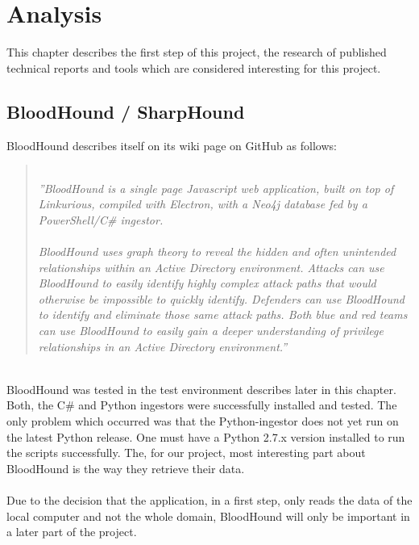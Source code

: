 \section{Analysis}
This chapter describes the first step of this project, the research of published technical reports and tools which are considered interesting for this project.
\subsection{BloodHound / SharpHound}
BloodHound describes itself on its wiki page on GitHub as follows:
\begin{quotation} \ \\
\textit{''BloodHound is a single page Javascript web application, built on top of Linkurious, compiled with Electron, with a Neo4j database fed by a PowerShell/C\# ingestor. \\
\ \\
BloodHound uses graph theory to reveal the hidden and often unintended relationships within an Active Directory environment. Attacks can use BloodHound to easily identify highly complex attack paths that would otherwise be impossible to quickly identify. Defenders can use BloodHound to identify and eliminate those same attack paths. Both blue and red teams can use BloodHound to easily gain a deeper understanding of privilege relationships in an Active Directory environment.''} 
\cite{blo2018}
\end{quotation}
\ \\
BloodHound was tested in the test environment describes later in this chapter. Both, the C\# and Python ingestors were successfully installed and tested. The only problem which occurred was that the Python-ingestor does not yet run on the latest Python release. One must have a Python 2.7.x version installed to run the scripts successfully.
The, for our project, most interesting part about BloodHound is the way they retrieve their data. \ \\
\ \\
Due to the decision that the application, in a first step, only reads the data of the local computer and not the whole domain, BloodHound will only be important in a later part of the project.

